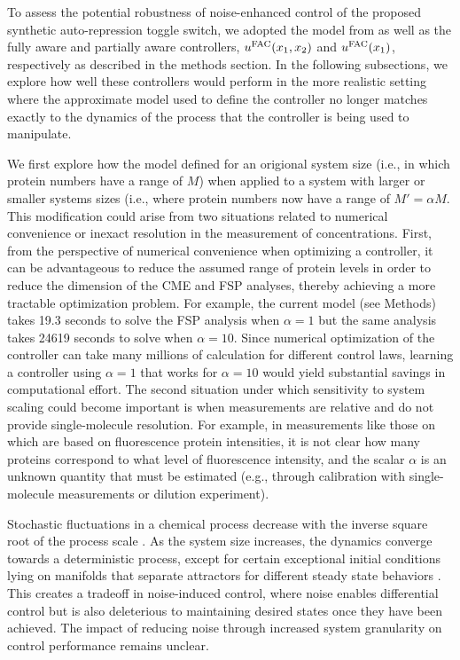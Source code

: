 \documentclass[12pt]{article}
\begin{document}
To assess the potential robustness of noise-enhanced control of the proposed synthetic auto-repression toggle switch, we adopted the model  from \cite{May2021} as well as the fully aware and partially aware controllers, $u^{\rm FAC}(x_1,x_2)$ and  $u^{\rm FAC}(x_1)$, respectively as described in the methods section.  In the following subsections, we explore how well these controllers would perform in the more realistic setting where the approximate model used to define the controller no longer matches exactly to the dynamics of the process that the controller is being used to manipulate. 

We first explore how the model defined for an origional system size (i.e., in which protein numbers have a range of $M$) when applied to a system with larger or smaller systems sizes (i.e., where protein numbers now have a range of $M' = \alpha M$.  This modification could arise from two situations related to numerical convenience or inexact resolution in the measurement of concentrations. First, from the perspective of numerical convenience when optimizing a controller, it can be advantageous to reduce the assumed range of protein levels in order to reduce the dimension of the CME and FSP analyses, thereby achieving a more tractable optimization problem.  For example, the current model (see Methods) takes 19.3 seconds to solve the FSP analysis when $\alpha=1$ but the same analysis takes 24619 seconds to solve when $\alpha=10$. Since numerical optimization of the controller can take many millions of calculation for different control laws, learning a controller using $\alpha=1$ that works for $\alpha=10$ would yield substantial savings in computational effort. The second situation under which sensitivity to system scaling could become important is when measurements are relative and do not provide single-molecule resolution. For example, in measurements like those on \cite{Baumschlager} which are based on fluorescence protein intensities, it is not clear how many proteins correspond to what level of fluorescence intensity, and the scalar $\alpha$ is an unknown quantity that must be estimated (e.g., through calibration with single-molecule measurements or dilution experiment\cite{XXX - look for elowitz paper or something similar that tried to calibrate for single-molecule counts}). 


Stochastic fluctuations in a chemical process decrease with the inverse square root of the process scale \cite{Kampen1961}. As the system size increases, the dynamics converge towards a deterministic process, except for certain exceptional initial conditions lying on manifolds that separate attractors for different steady state behaviors \cite{XXX}. This creates a tradeoff in noise-induced control, where noise enables differential control but is also deleterious to maintaining desired states once they have been achieved. The impact of reducing noise through increased system granularity on control performance remains unclear.
\end{document}
